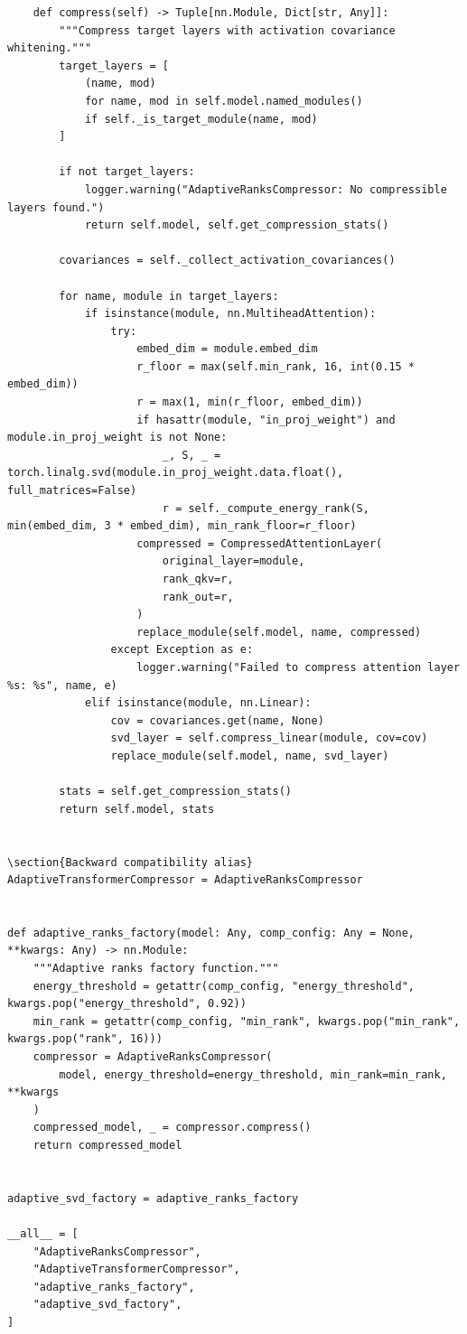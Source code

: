 \begin{lstlisting}
    def compress(self) -> Tuple[nn.Module, Dict[str, Any]]:
        """Compress target layers with activation covariance whitening."""
        target_layers = [
            (name, mod)
            for name, mod in self.model.named_modules()
            if self._is_target_module(name, mod)
        ]

        if not target_layers:
            logger.warning("AdaptiveRanksCompressor: No compressible layers found.")
            return self.model, self.get_compression_stats()

        covariances = self._collect_activation_covariances()

        for name, module in target_layers:
            if isinstance(module, nn.MultiheadAttention):
                try:
                    embed_dim = module.embed_dim
                    r_floor = max(self.min_rank, 16, int(0.15 * embed_dim))
                    r = max(1, min(r_floor, embed_dim))
                    if hasattr(module, "in_proj_weight") and module.in_proj_weight is not None:
                        _, S, _ = torch.linalg.svd(module.in_proj_weight.data.float(), full_matrices=False)
                        r = self._compute_energy_rank(S, min(embed_dim, 3 * embed_dim), min_rank_floor=r_floor)
                    compressed = CompressedAttentionLayer(
                        original_layer=module,
                        rank_qkv=r,
                        rank_out=r,
                    )
                    replace_module(self.model, name, compressed)
                except Exception as e:
                    logger.warning("Failed to compress attention layer %s: %s", name, e)
            elif isinstance(module, nn.Linear):
                cov = covariances.get(name, None)
                svd_layer = self.compress_linear(module, cov=cov)
                replace_module(self.model, name, svd_layer)

        stats = self.get_compression_stats()
        return self.model, stats


\section{Backward compatibility alias}
AdaptiveTransformerCompressor = AdaptiveRanksCompressor


def adaptive_ranks_factory(model: Any, comp_config: Any = None, **kwargs: Any) -> nn.Module:
    """Adaptive ranks factory function."""
    energy_threshold = getattr(comp_config, "energy_threshold", kwargs.pop("energy_threshold", 0.92))
    min_rank = getattr(comp_config, "min_rank", kwargs.pop("min_rank", kwargs.pop("rank", 16)))
    compressor = AdaptiveRanksCompressor(
        model, energy_threshold=energy_threshold, min_rank=min_rank, **kwargs
    )
    compressed_model, _ = compressor.compress()
    return compressed_model


adaptive_svd_factory = adaptive_ranks_factory

__all__ = [
    "AdaptiveRanksCompressor",
    "AdaptiveTransformerCompressor",
    "adaptive_ranks_factory",
    "adaptive_svd_factory",
]
\end{lstlisting}
